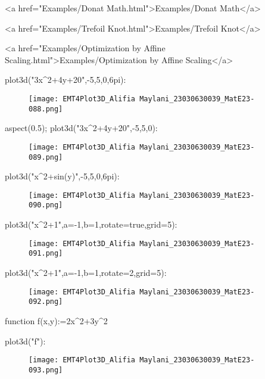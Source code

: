 \documentclass{article}
\begin{document}
  <a href="Examples/Donat Math.html">Examples/Donat Math</a>  

  <a href="Examples/Trefoil Knot.html">Examples/Trefoil Knot</a>  

  <a href="Examples/Optimization by Affine Scaling.html">Examples/Optimization by Affine Scaling</a>  

\>plot3d("3x^2+4y+20",-5,5,0,6\*pi):


\begin{figure}
    \centering
    \texttt{[image: EMT4Plot3D\_Alifia Maylani\_23030630039\_MatE23-088.png]}
    \caption{}
    \label{fig:enter-label}
\end{figure}

\>aspect(0.5); plot3d("3x^2+4y+20",-5,5,0):


\begin{figure}
    \centering
    \texttt{[image: EMT4Plot3D\_Alifia Maylani\_23030630039\_MatE23-089.png]}
    \caption{}
    \label{fig:enter-label}
\end{figure}

\>plot3d("x^2+sin(y)",-5,5,0,6\*pi):


\begin{figure}
    \centering
    \texttt{[image: EMT4Plot3D\_Alifia Maylani\_23030630039\_MatE23-090.png]}
    \caption{}
    \label{fig:enter-label}
\end{figure}

\>plot3d("x^2+1",a=-1,b=1,rotate=true,grid=5):


\begin{figure}
    \centering
    \texttt{[image: EMT4Plot3D\_Alifia Maylani\_23030630039\_MatE23-091.png]}
    \caption{}
    \label{fig:enter-label}
\end{figure}

\>plot3d("x^2+1",a=-1,b=1,rotate=2,grid=5):


\begin{figure}
    \centering
    \texttt{[image: EMT4Plot3D\_Alifia Maylani\_23030630039\_MatE23-092.png]}
    \caption{}
    \label{fig:enter-label}
\end{figure}

\>function f(x,y):=2\*x^2+3\*y^2

\>plot3d("f"):


\begin{figure}
    \centering
    \texttt{[image: EMT4Plot3D\_Alifia Maylani\_23030630039\_MatE23-093.png]}
    \caption{}
    \label{fig:enter-label}
\end{figure}
\end{document}
